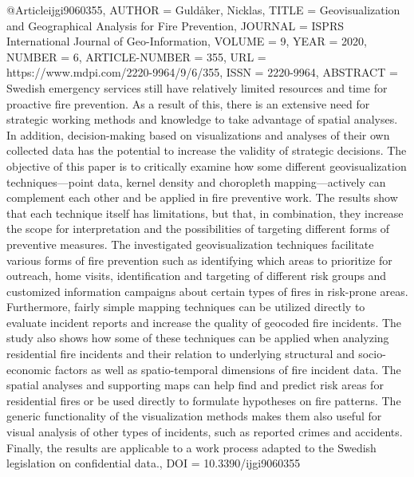 
@Article{ijgi9060355,
AUTHOR = {Guldåker, Nicklas},
TITLE = {Geovisualization and Geographical Analysis for Fire Prevention},
JOURNAL = {ISPRS International Journal of Geo-Information},
VOLUME = {9},
YEAR = {2020},
NUMBER = {6},
ARTICLE-NUMBER = {355},
URL = {https://www.mdpi.com/2220-9964/9/6/355},
ISSN = {2220-9964},
ABSTRACT = {Swedish emergency services still have relatively limited resources and time for proactive fire prevention. As a result of this, there is an extensive need for strategic working methods and knowledge to take advantage of spatial analyses. In addition, decision-making based on visualizations and analyses of their own collected data has the potential to increase the validity of strategic decisions. The objective of this paper is to critically examine how some different geovisualization techniques—point data, kernel density and choropleth mapping—actively can complement each other and be applied in fire preventive work. The results show that each technique itself has limitations, but that, in combination, they increase the scope for interpretation and the possibilities of targeting different forms of preventive measures. The investigated geovisualization techniques facilitate various forms of fire prevention such as identifying which areas to prioritize for outreach, home visits, identification and targeting of different risk groups and customized information campaigns about certain types of fires in risk-prone areas. Furthermore, fairly simple mapping techniques can be utilized directly to evaluate incident reports and increase the quality of geocoded fire incidents. The study also shows how some of these techniques can be applied when analyzing residential fire incidents and their relation to underlying structural and socio-economic factors as well as spatio-temporal dimensions of fire incident data. The spatial analyses and supporting maps can help find and predict risk areas for residential fires or be used directly to formulate hypotheses on fire patterns. The generic functionality of the visualization methods makes them also useful for visual analysis of other types of incidents, such as reported crimes and accidents. Finally, the results are applicable to a work process adapted to the Swedish legislation on confidential data.},
DOI = {10.3390/ijgi9060355}
}



